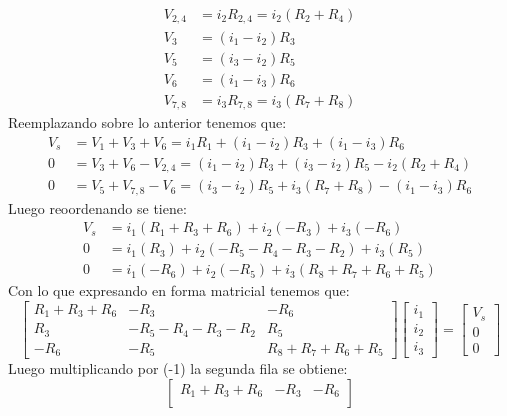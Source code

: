 \documentclass[
  11pt,
  letterpaper,
   addpoints,
  ]{exam}
\begin{document}
\begin{solution}
\begin{enumerate}
\begin{align}
        V_{2,4} &= i_2 R_{2,4}= i_2 (R_2 + R_4) \\
        V_3 &= (i_1 - i_2) R_3 \\
        V_5 &= (i_3 - i_2) R_5 \\
        V_6 &= (i_1 - i_3) R_6 \\
        V_{7,8} &= i_3 R_{7,8} = i_3 (R_7 + R_8)
    \end{align}
    Reemplazando sobre lo anterior tenemos que:
    \begin{align}
        V_s &= V_1 + V_3 + V_6 = i_1 R_1 + (i_1 - i_2) R_3 + (i_1 - i_3) R_6 \\
        0 &= V_3 + V_6 - V_{2,4}= (i_1 - i_2) R_3 + (i_3 - i_2) R_5 - i_2 (R_2 + R_4) \\
        0 &= V_5 + V_{7,8}- V_6 = (i_3 - i_2) R_5 + i_3 (R_7 + R_8) - (i_1 - i_3) R_6 
    \end{align}
    Luego reoordenando se tiene:
    \begin{align}
        V_s &= i_1 (R_1 + R_3 + R_6) + i_2 (-R_3) + i_3 (-R_6) \\
        0 &= i_1 (R_3) + i_2 (-R_5 - R_4 - R_3 - R_2) + i_3 (R_5) \\
        0 &= i_1 (-R_6) + i_2 (-R_5) + i_3 (R_8 + R_7 + R_6 + R_5) 
    \end{align}
    Con lo que expresando en forma matricial tenemos que:
    \begin{equation}
        \begin{bmatrix}
            R_1 + R_3 + R_6 & -R_3 & -R_6 \\
            R_3 & -R_5 - R_4 - R_3 - R_2 & R_5 \\
            -R_6 & -R_5 & R_8 + R_7 + R_6 + R_5
        \end{bmatrix}
        \begin{bmatrix}
            i_1 \\
            i_2 \\
            i_3
        \end{bmatrix}
        =
        \begin{bmatrix}
            V_s \\
            0 \\
            0
        \end{bmatrix}
    \end{equation}
    Luego multiplicando por (-1) la segunda fila se obtiene:
    \begin{equation}
        \begin{bmatrix}
            R_1 + R_3 + R_6 & -R_3 & -R_6 \\

\end{bmatrix}
\end{equation}
\end{enumerate}
\end{solution}
\end{document}

